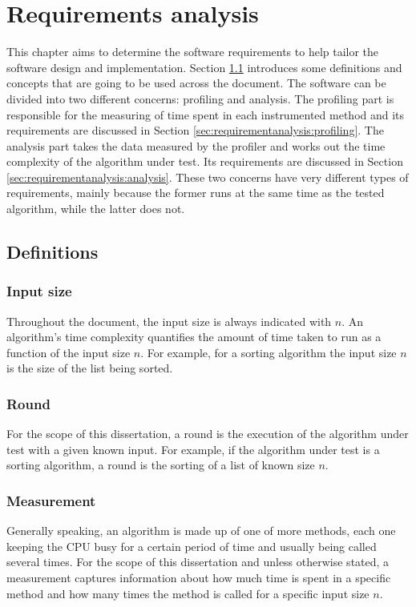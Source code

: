 \chapter{Requirements analysis}

This chapter aims to determine the software requirements to help tailor the software design and implementation. Section \ref{sec:requirementanalysis:definitions} introduces some definitions and concepts that are going to be used across the document. The software can be divided into two different concerns: profiling and analysis. The profiling part is responsible for the measuring of time spent in each instrumented method and its requirements are discussed in Section \ref{sec:requirementanalysis:profiling}. The analysis part takes the data measured by the profiler and works out the time complexity of the algorithm under test. Its requirements are discussed in Section \ref{sec:requirementanalysis:analysis}. These two concerns have very different types of requirements, mainly because the former runs at the same time as the tested algorithm, while the latter does not.

\section{Definitions}
\label{sec:requirementanalysis:definitions}

\subsection{Input size}
Throughout the document, the input size is always indicated with $n$. An algorithm's time complexity quantifies the amount of time taken to run as a function of the input size $n$. For example, for a sorting algorithm the input size $n$ is the size of the list being sorted.

\subsection{Round}
For the scope of this dissertation, a round is the execution of the algorithm under test with a given known input. For example, if the algorithm under test is a sorting algorithm, a round is the sorting of a list of known size $n$.

\subsection{Measurement}
Generally speaking, an algorithm is made up of one of more methods, each one keeping the CPU busy for a certain period of time and usually being called several times. For the scope of this dissertation and unless otherwise stated, a measurement captures information about how much time is spent in a specific method and how many times the method is called for a specific input size $n$.


